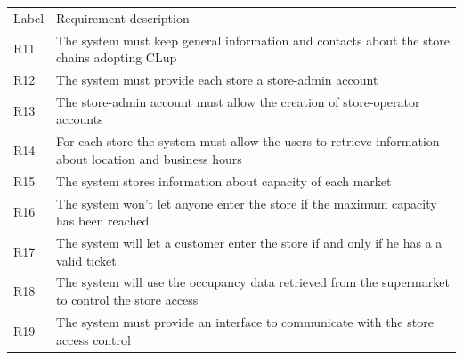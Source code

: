 \renewcommand{\arraystretch}{1.4}
\begin{tabular}{C{1cm}L{14.1cm}}
    Label & Requirement description                                                                                                                                                                     \\

    R11   & The system must keep general information and contacts about the store chains adopting CLup                                                                                                  \\
    R12   & The system must provide each store a store-admin account                                                                                                                                    \\
    R13   & The store-admin account must allow the creation of store-operator accounts                                                                                                                  \\
    R14   & For each store the system must allow the users to retrieve information about location and business hours                                                                                    \\
    R15   & The system stores information about capacity of each market                                                                                                                                 \\
    R16   & The system won't let anyone enter the store if the maximum capacity has been reached                                                                                                        \\
    R17   & The system will let a customer enter the store if and only if he has a a valid ticket                                                                                                       \\
    R18   & The system will use the occupancy data retrieved from the supermarket to control the store access                                                                                           \\
    R19   & The system must provide an interface to communicate with the store access control                                                                                                        \\

\end{tabular}
